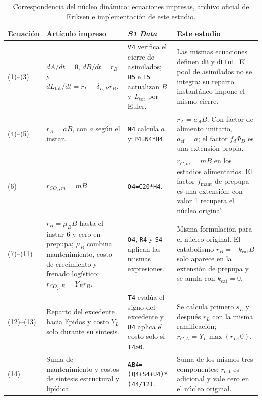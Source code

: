 \begin{table}[htbp]
  \centering
  \small
  \caption{Correspondencia del núcleo dinámico: ecuaciones impresas, archivo
  oficial de Eriksen e implementación de este estudio.}
  \label{tab:s9-nucleo}
  \setlength{\tabcolsep}{3pt}
  \begin{tabular}{p{1.0cm}p{3.8cm}p{4.2cm}p{5.0cm}}
    \toprule
    Ecuación & Artículo impreso & \emph{S1 Data} & Este estudio \\
    \midrule
    (1)--(3) &
    $dA/dt=0$, $dB/dt=r_B$ y
    $dL_{\mathrm{tot}}/dt=r_L+\delta_{L,B}r_B$. &
    \texttt{V4} verifica el cierre de asimilados; \texttt{H5} e \texttt{I5}
    actualizan $B$ y $L_{\mathrm{tot}}$ por Euler. &
    Las mismas ecuaciones definen \texttt{dB} y \texttt{dLtot}. El pool de
    asimilados no se integra: su reparto instantáneo impone el mismo cierre. \\
    \midrule
    (4)--(5) &
    $r_A=aB$, con $a$ según el instar. &
    \texttt{N4} calcula $a$ y \texttt{P4=N4*H4}. &
    $r_A=a_{\mathrm{ef}}B$. Con factor de alimento unitario,
    $a_{\mathrm{ef}}=a$; el factor $f_d\Phi_D$ es una extensión propia. \\
    \midrule
    (6) &
    $r_{CO_2,m}=mB$. &
    \texttt{Q4=C20*H4}. &
    $r_{C,m}=mB$ en los estadios alimentarios. El factor
    $f_{\mathrm{mant}}$ de prepupa es una extensión; con valor 1 recupera el
    núcleo original. \\
    \midrule
    (7)--(11) &
    $r_B=\mu_BB$ hasta el instar 6 y cero en prepupa;
    $\mu_B$ combina mantenimiento, costo de crecimiento y frenado logístico;
    $r_{CO_2,B}=Y_Br_B$. &
    \texttt{O4}, \texttt{R4} y \texttt{S4} aplican las mismas expresiones. &
    Misma formulación para el núcleo original. El catabolismo
    $r_B=-k_{\mathrm{cat}}B$ solo aparece en la extensión de prepupa y se
    anula con $k_{\mathrm{cat}}=0$. \\
    \midrule
    (12)--(13) &
    Reparto del excedente hacia lípidos y costo $Y_L$ solo durante su
    síntesis. &
    \texttt{T4} evalúa el signo del excedente y \texttt{U4} aplica el costo
    solo si \texttt{T4>0}. &
    Se calcula primero $s_L$ y después $r_L$ con la misma ramificación;
    $r_{C,L}=Y_L\max(r_L,0)$. \\
    \midrule
    (14) &
    Suma de mantenimiento y costos de síntesis estructural y lipídica. &
    \texttt{AB4=(Q4+S4+U4)*(44/12)}. &
    Suma de los mismos tres componentes; $r_{\mathrm{cat}}$ es adicional y
    vale cero en el núcleo original. \\
    \bottomrule
  \end{tabular}
\end{table}

